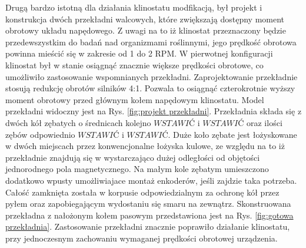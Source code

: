 Drugą bardzo istotną dla działania klinostatu modfikacją, był projekt i konstrukcja dwóch
 przekładni walcowych, które zwiększają dostępny moment obrotowy układu napędowego. Z uwagi na
  to iż klinostat przeznaczony będzie przedewszystkim do badań nad organizmami roślinnymi, jego
   prędkość obrotowa powinna mieścić się w zakresie od 1 do 2 RPM. W pierwotnej konfiguracji
    klinostat był w stanie osiągnąć znacznie większe prędkości obrotowe, co umożliwiło
     zastosowanie wspomnianych przekładni. Zaprojektowanie przekładnie stosują redukcję obrotów
      silników 4:1. Pozwala to osiągnąć czterokrotnie wyższy moment obrotowy przed głównym kołem
       napędowym klinostatu. Model przekładni widoczny jest na Rys. \ref{fig:projekt
       	 przekładni}. Przekładnia składa się z dwóch kół zębatych o średnicach kolejno $WSTAWIĆ$
         i $WSTAWIĆ$ oraz ilości zębów odpowiednio $WSTAWIĆ$ i $WSTAWIĆ$. Duże koło zębate jest
          łożyskowane w dwóch miejscach przez konwencjonalne łożyska kulowe, ze względu na to iż
           przekładnie znajdują się w wystarczająco dużej odległości od objętości jednorodnego
            pola magnetycznego. Na małym kole zębatym umieszczono dodatkowo wpusty umożliwiajace
             montaż enkoderów, jeśli zajdzie taka potrzeba. Całość zamknięta została w korpusie
              odpowiedzialnym za ochronę kół przez pyłem oraz zapobiegającym wydostaniu się
               smaru na zewnątrz. Skonstruowana przekładna z nałożonym kołem pasowym
                przedstawiona jest na Rys. \ref{fig:gotowa przekładnia}. Zastosowanie przekładni
                 znacznie poprawiło działanie klinostatu, przy jednoczesnym zachowaniu wymaganej
                  prędkości obrotowej urządzenia.       


